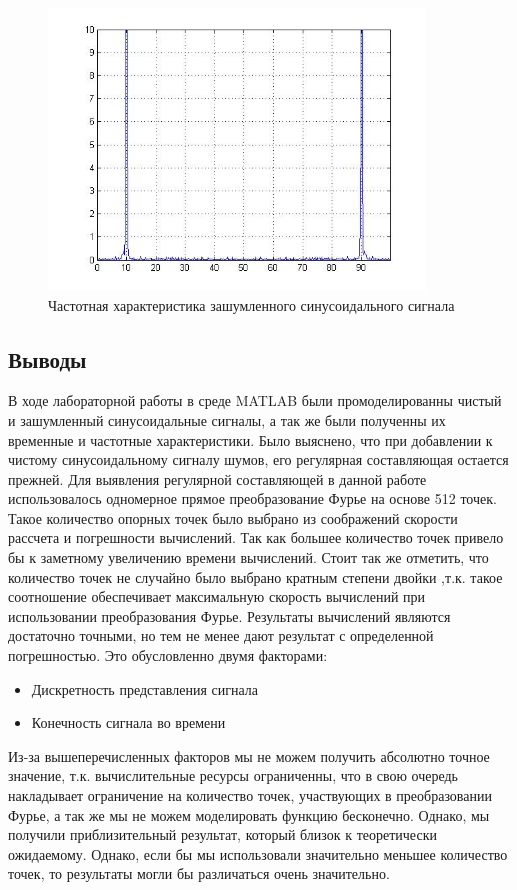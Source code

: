 \documentclass[10pt,a4paper]{article}
\begin{document}
\newpage
\begin{figure}[h]
\centering
\includegraphics[width=10cm]{4.jpg} 
\caption{Частотная характеристика зашумленного синусоидального сигнала} 
\label{fig.3} 
\end{figure}

\subsection{Выводы}
\newpage
В ходе лабораторной работы в среде MATLAB были промоделированны чистый и зашумленный синусоидальные сигналы, а так же были полученны их временные и частотные характеристики. Было выяснено, что при добавлении к чистому синусоидальному сигналу шумов, его регулярная составляющая остается прежней. Для выявления регулярной составляющей в данной работе использовалось одномерное прямое преобразование Фурье на основе 512 точек. Такое количество опорных точек было выбрано из соображений скорости рассчета и погрешности вычислений. Так как большее количество точек привело бы к заметному увеличению времени вычислений. Стоит так же отметить, что количество точек не случайно было выбрано кратным степени двойки ,т.к. такое соотношение обеспечивает максимальную скорость вычислений при использовании преобразования Фурье. Результаты вычислений являются достаточно точными, но тем не менее дают результат с определенной погрешностью. Это обусловленно двумя факторами:
\begin{itemize}
\item Дискретность представления сигнала
\item Конечность сигнала во времени
\end{itemize}
Из-за вышеперечисленных факторов мы не можем получить абсолютно точное значение, т.к. вычислительные ресурсы ограниченны, что в свою очередь накладывает ограничение на количество точек, участвующих в преобразовании Фурье, а так же мы не можем моделировать функцию бесконечно. Однако, мы получили приблизительный результат, который близок к теоретически ожидаемому. Однако, если бы мы использовали значительно меньшее количество точек, то результаты могли бы различаться очень значительно.
\end{document}
